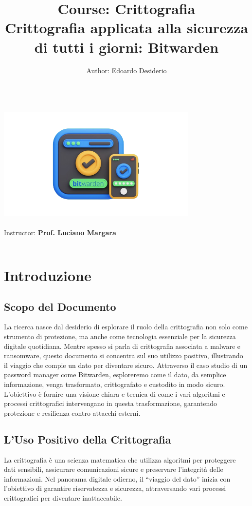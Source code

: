 \documentclass[a4paper,12pt]{report}
\title{\Large Course: Crittografia    \\[0.5cm]
        \bf\Large Crittografia applicata alla sicurezza di tutti i giorni: Bitwarden}
\author{\large Author: Edoardo Desiderio\\ \ \\}
\date{}
\begin{document}
	\makeatletter
		\begin{titlepage}
			\begin{center}
		{ \includegraphics[width=10cm]{bitwarden-removebg-preview.png}}
		{\ \\}
			\vbox{}\vspace{2cm}
				{\@title }\\[3cm] 
				{\@author}
				{\large Instructor: \bf Prof. Luciano Margara\\ \ \\}
			\end{center}
		\end{titlepage}
	\makeatother
	\mbox{\thispagestyle{empty}}
	\titlepage
	\tableofcontents{\thispagestyle{empty}}
	\setcounter{page}{0}

	\chapter{Introduzione}
		\section{Scopo del Documento}
		La ricerca nasce dal desiderio di esplorare il ruolo della crittografia non 
		solo come strumento di protezione, ma anche come tecnologia essenziale per la
		sicurezza digitale quotidiana. Mentre spesso si parla di crittografia associata 
		a malware e ransomware, questo documento si concentra sul suo utilizzo positivo, 
		illustrando il viaggio che compie un dato per diventare sicuro.
		Attraverso il caso studio di un password manager come Bitwarden, esploreremo 
		come il dato, da semplice informazione, venga trasformato, crittografato e custodito
		in modo sicuro. L’obiettivo è fornire una visione chiara e tecnica di come i vari 
		algoritmi e processi crittografici intervengano in questa trasformazione, 
		garantendo protezione e resilienza contro attacchi esterni.
		\section{L'Uso Positivo della Crittografia} 
		La crittografia è una scienza matematica che utilizza algoritmi per
		proteggere dati sensibili, assicurare comunicazioni sicure e preservare
		l’integrità delle informazioni. Nel panorama digitale odierno, il
		“viaggio del dato” inizia con l’obiettivo di garantire riservatezza e
		sicurezza, attraversando vari processi crittografici per diventare
		inattaccabile.
\end{document}
